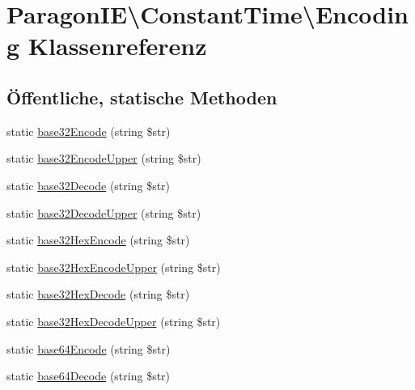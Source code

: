 \hypertarget{class_paragon_i_e_1_1_constant_time_1_1_encoding}{}\section{Paragon\+IE\textbackslash{}Constant\+Time\textbackslash{}Encoding Klassenreferenz}
\label{class_paragon_i_e_1_1_constant_time_1_1_encoding}
\subsection*{Öffentliche, statische Methoden}
\begin{DoxyCompactItemize}
\item 
static \mbox{\hyperlink{class_paragon_i_e_1_1_constant_time_1_1_encoding_a98910a6c31677618bb7f26d2d8600bfe}{base32\+Encode}} (string \$str)
\item 
static \mbox{\hyperlink{class_paragon_i_e_1_1_constant_time_1_1_encoding_a654d2a9a21085c46df7d29fd6c3f9266}{base32\+Encode\+Upper}} (string \$str)
\item 
static \mbox{\hyperlink{class_paragon_i_e_1_1_constant_time_1_1_encoding_ab15e07a5e22dd3fd99807afccbe54d4d}{base32\+Decode}} (string \$str)
\item 
static \mbox{\hyperlink{class_paragon_i_e_1_1_constant_time_1_1_encoding_a49b7623f6e52f754db25d878ac21857d}{base32\+Decode\+Upper}} (string \$str)
\item 
static \mbox{\hyperlink{class_paragon_i_e_1_1_constant_time_1_1_encoding_a51edc0fd411e99c769a34ae7e9d09c26}{base32\+Hex\+Encode}} (string \$str)
\item 
static \mbox{\hyperlink{class_paragon_i_e_1_1_constant_time_1_1_encoding_ae2c93c1bd970c4e5085a9c7041bea093}{base32\+Hex\+Encode\+Upper}} (string \$str)
\item 
static \mbox{\hyperlink{class_paragon_i_e_1_1_constant_time_1_1_encoding_a886acb7bba501302cd61ef2e197001f7}{base32\+Hex\+Decode}} (string \$str)
\item 
static \mbox{\hyperlink{class_paragon_i_e_1_1_constant_time_1_1_encoding_a485a402c0d7bc250ba13d045d1559524}{base32\+Hex\+Decode\+Upper}} (string \$str)
\item 
static \mbox{\hyperlink{class_paragon_i_e_1_1_constant_time_1_1_encoding_a561a225af7ec7359fb76e9ca69a8859f}{base64\+Encode}} (string \$str)
\item 
static \mbox{\hyperlink{class_paragon_i_e_1_1_constant_time_1_1_encoding_a23f427b9ebd2f33ea189c609a396a512}{base64\+Decode}} (string \$str)

\end{DoxyCompactItemize}
